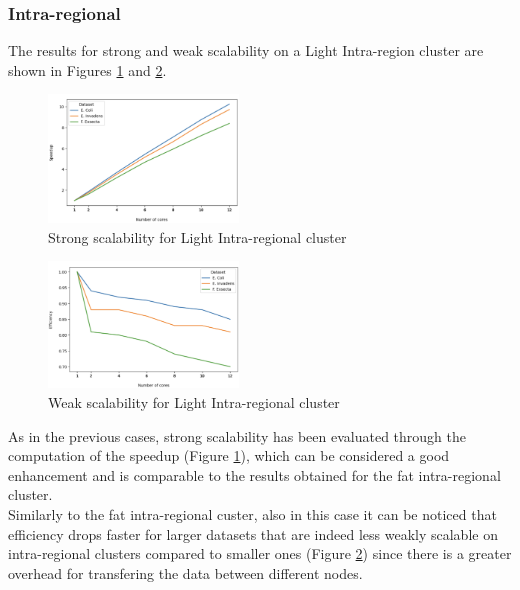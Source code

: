 \documentclass[final,5p,times,twocolumn,authoryear]{elsarticle}
\begin{document}
\subsubsection{Intra-regional}
The results for strong and weak scalability on a Light Intra-region cluster are shown in Figures \ref{fig:light-intra-strong} and \ref{fig:light-intra-weak}. \\
\begin{figure}[H]
   \centering
   \includegraphics[width=0.45\textwidth]{images/light_intra_strong.png}
   \caption{Strong scalability for Light Intra-regional cluster }
   \label{fig:light-intra-strong}
\end{figure}
\begin{figure}[H]
   \centering
   \includegraphics[width=0.45\textwidth]{images/light_intra_weak.png}
   \caption{Weak scalability for Light Intra-regional cluster }
   \label{fig:light-intra-weak}
\end{figure}
As in the previous cases, strong scalability has been evaluated through the computation of the speedup (Figure \ref{fig:light-intra-strong}), which can be considered a good enhancement and is comparable to the results obtained for the fat intra-regional cluster. \\
Similarly to the fat intra-regional custer, also in this case it can be noticed that efficiency drops faster for larger datasets that are indeed less weakly scalable on intra-regional clusters compared to smaller ones (Figure \ref{fig:light-intra-weak}) since there is a greater overhead for transfering the data between different nodes.
\end{document}
